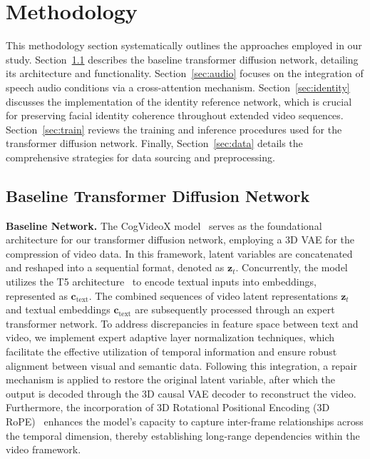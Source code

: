 \section{Methodology}  
This methodology section systematically outlines the approaches employed in our study. 
Section~\ref{sec:baseline} describes the baseline transformer diffusion network, detailing its architecture and functionality. 
Section~\ref{sec:audio} focuses on the integration of speech audio conditions via a cross-attention mechanism. 
Section~\ref{sec:identity} discusses the implementation of the identity reference network, which is crucial for preserving facial identity coherence throughout extended video sequences. 
Section~\ref{sec:train} reviews the training and inference procedures used for the transformer diffusion network. 
Finally, Section~\ref{sec:data} details the comprehensive strategies for data sourcing and preprocessing.

\subsection{Baseline Transformer Diffusion Network}\label{sec:baseline}
\noindent\textbf{Baseline Network.}  
The CogVideoX model~\cite{yang2024cogvideox} serves as the foundational architecture for our transformer diffusion network, employing a 3D VAE for the compression of video data. 
In this framework, latent variables are concatenated and reshaped into a sequential format, denoted as \(\mathbf{z}_t\). 
Concurrently, the model utilizes the T5 architecture~\cite{raffel2023t5} to encode textual inputs into embeddings, represented as \(\mathbf{c}_{\text{text}}\). 
The combined sequences of video latent representations \(\mathbf{z}_t\) and textual embeddings \(\mathbf{c}_{\text{text}}\) are subsequently processed through an expert transformer network. 
To address discrepancies in feature space between text and video, we implement expert adaptive layer normalization techniques, which facilitate the effective utilization of temporal information and ensure robust alignment between visual and semantic data. 
Following this integration, a repair mechanism is applied to restore the original latent variable, after which the output is decoded through the 3D causal VAE decoder to reconstruct the video. 
Furthermore, the incorporation of 3D Rotational Positional Encoding (3D RoPE)~\cite{yang2024cogvideox} enhances the model's capacity to capture inter-frame relationships across the temporal dimension, thereby establishing long-range dependencies within the video framework.  

